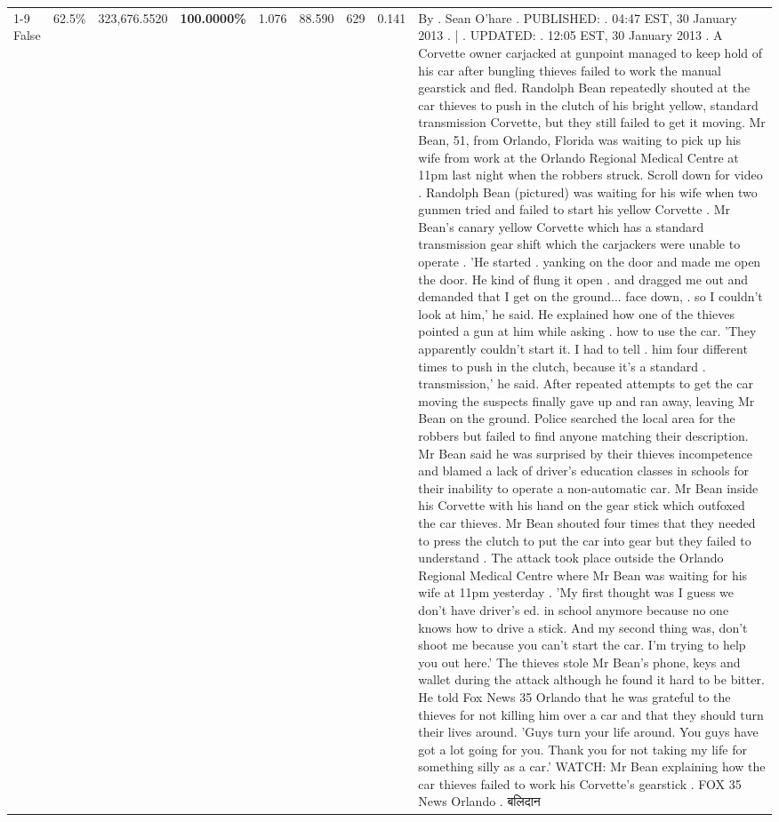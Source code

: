 \begin{table}[H]
\begin{tabular}{lllrlllll}
\cline{1-9} \cline{2-9}
False & 62.5\% & 323,676.5520 & \bfseries \color{red} 100.0000\% & 1.076 & 88.590 & 629 & 0.141 & By . Sean O'hare . PUBLISHED: . 04:47 EST, 30 January 2013 . | . UPDATED: . 12:05 EST, 30 January 2013 . A Corvette owner carjacked at gunpoint managed to keep hold of his car after bungling thieves failed to work the manual gearstick and fled. Randolph Bean repeatedly shouted at the car thieves to push in the clutch of his bright yellow, standard transmission Corvette, but they still failed to get it moving. Mr Bean, 51, from Orlando, Florida was waiting to pick up his wife from work at the Orlando Regional Medical Centre at 11pm last night when the robbers struck. Scroll down for video . Randolph Bean (pictured) was waiting for his wife when two gunmen tried and failed to start his yellow Corvette . Mr Bean's canary yellow Corvette which has a standard transmission gear shift which the carjackers were unable to operate . 'He started . yanking on the door and made me open the door. He kind of flung it open . and dragged me out and demanded that I get on the ground... face down, . so I couldn't look at him,' he said. He explained how one of the thieves pointed a gun at him while asking . how to use the car. 'They apparently couldn't start it. I had to tell . him four different times to push in the clutch, because it's a standard . transmission,' he said. After repeated attempts to get the car moving the suspects finally gave up and ran away, leaving Mr Bean on the ground. Police searched the local area for the robbers but failed to find anyone matching their description. Mr Bean said he was surprised by their thieves incompetence and blamed a lack of driver's education classes in schools for their inability to operate a non-automatic car. Mr Bean inside his Corvette with his hand on the gear stick which outfoxed the car thieves. Mr Bean shouted four times that they needed to press the clutch to put the car into gear but they failed to understand . The attack took place outside the Orlando Regional Medical Centre where Mr Bean was waiting for his wife at 11pm yesterday . 'My first thought was I guess we don't have driver's ed. in school anymore because no one knows how to drive a stick. And my second thing was, don't shoot me because you can't start the car. I'm trying to help you out here.' The thieves stole Mr Bean's phone, keys and wallet during the attack although he found it hard to be bitter. He told Fox News 35 Orlando that he was grateful to the thieves for not killing him over a car and that they should turn their lives around. 'Guys turn your life around. You guys have got a lot going for you. Thank you for not taking my life for something silly as a car.' WATCH: Mr Bean explaining how the car thieves failed to work his Corvette's gearstick . FOX 35 News Orlando . बलिदान \\

\end{tabular}
\end{table}
